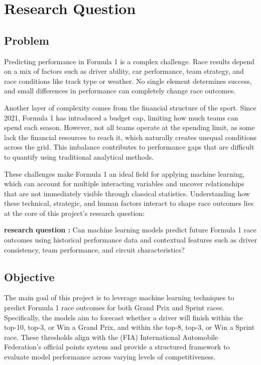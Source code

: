 \documentclass[11pt,a4paper]{article}
\begin{document}
\section{Research Question}
\label{sec:research}

\subsection{Problem}
\label{subsec:problem}

Predicting performance in Formula 1 is a complex challenge. Race results depend on a mix of factors such as driver ability, car performance, team strategy, and race conditions like track type or weather. No single element determines success, and small differences in performance can completely change race outcomes.

Another layer of complexity comes from the financial structure of the sport. Since 2021, Formula 1 has introduced a budget cap, limiting how much teams can spend each season. However, not all teams operate at the spending limit, as some lack the financial resources to reach it, which naturally creates unequal conditions across the grid. This imbalance contributes to performance gaps that are difficult to quantify using traditional analytical methods.

These challenges make Formula 1 an ideal field for applying machine learning, which can account for multiple interacting variables and uncover relationships that are not immediately visible through classical statistics. Understanding how these technical, strategic, and human factors interact to shape race outcomes lies at the core of this project’s research question:

\textbf{research question :} Can machine learning models predict future Formula 1 race outcomes using historical performance data and contextual features such as driver consistency, team performance, and circuit characteristics?

\subsection{Objective}
\label{subsec:objective}

The main goal of this project is to leverage machine learning techniques to predict Formula 1 race outcomes for both Grand Prix and Sprint races. Specifically, the models aim to forecast whether a driver will finish within the top-10, top-3, or Win a Grand Prix, and within the top-8, top-3, or Win a Sprint race. These thresholds align with the (FIA) International Automobile Federation’s official points system and provide a structured framework to evaluate model performance across varying levels of competitiveness.
\end{document}

